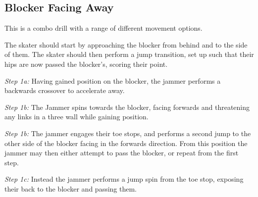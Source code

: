 \subsection*{Blocker Facing Away}
\label{drill:jammer_movement/jump_jukes/blocker_facing_away}

This is a combo drill with a range of different movement options.

The skater should start by approaching the blocker from behind and to the side of them. 
The skater should then perform a jump transition, set up such that their hips are now passed the blocker's, scoring their point.

{\it Step 1a:}
Having gained position on the blocker, the jammer performs a backwards crossover to accelerate away. 

{\it Step 1b:}
The Jammer spins towards the blocker, facing forwards and threatening any links in a three wall while gaining position.

{\it Step 1b:}
The jammer engages their toe stops, and performs a second jump to the other side of the blocker facing in the forwards direction. 
From this position the jammer may then either attempt to pass the blocker, or repeat from the first step.

{\it Step 1c:}
Instead the jammer performs a jump spin from the toe stop, exposing their back to the blocker and passing them. 
